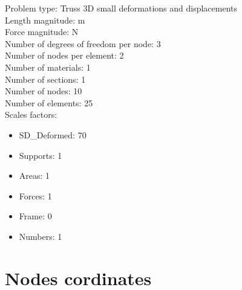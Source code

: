 \documentclass[a4paper,11pt]{article}
\begin{document}
Problem type: Truss 3D small deformations and displacements\\ 

Length magnitude: m \\

Force magnitude: N \\

Number of degrees of freedom per node: 3 \\

Number of nodes per element: 2 \\

Number of materials: 1 \\

Number of sections: 1 \\

Number of nodes: 10 \\

Number of elements: 25 \\

Scales factors: 
\begin{itemize} 
\item  SD\_Deformed: 70 
\item  Supports: 1 
\item  Areas: 1 
\item  Forces: 1 
\item  Frame: 0 
\item  Numbers: 1 
\end{itemize} 
\newpage       

\section{Nodes cordinates} 
\end{document}
